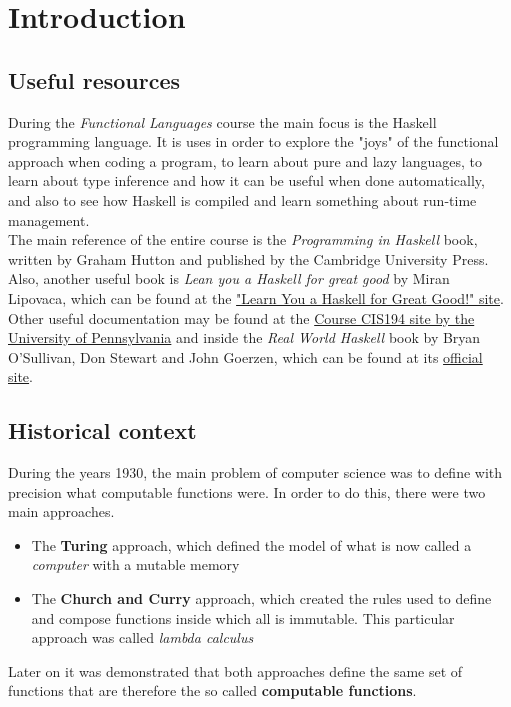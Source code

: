 \newpage
\chapter{Introduction}
\section{Useful resources}
During the \textit{Functional Languages} course the main focus is the Haskell programming language. It is uses in order to explore the "joys" of the functional approach when coding a program, to learn about pure and lazy languages, to learn about type inference and how it can be useful when done automatically, and also to see how Haskell is compiled and learn something about run-time management. \\
The main reference of the entire course is the \textit{Programming in Haskell} book, written by Graham Hutton and published by the Cambridge University Press. Also, another useful book is \textit{Lean you a Haskell for great good} by Miran Lipovaca, which can be found at the \href{http://learnyouahaskell.com/chapters}{"Learn You a Haskell for Great Good!" site}. \\
Other useful documentation may be found at the \href{http://www.seas.upenn.edu/~cis194}{Course CIS194 site by the University of Pennsylvania} and inside the \textit{Real World Haskell} book by Bryan O'Sullivan, Don Stewart and John Goerzen, which can be found at its \href{http://book.realworldhaskell.org/read/}{official site}.

\section{Historical context}
During the years 1930, the main problem of computer science was to define with precision what computable functions were. In order to do this, there were two main approaches. 

\begin{itemize}
	\item The \textbf{Turing} approach, which defined the model of what is now called a \textit{computer} with a mutable memory
	\item The \textbf{Church and Curry} approach, which created the rules used to define and compose functions inside which all is immutable. This particular approach was called \textit{lambda calculus}
\end{itemize}

Later on it was demonstrated that both approaches define the same set of functions that are therefore the so called \textbf{computable functions}.
\linebreak \linebreak

